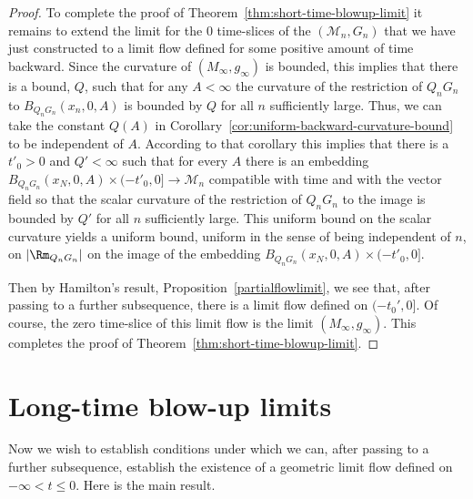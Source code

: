 \begin{proof}
To complete the proof of Theorem~\ref{thm:short-time-blowup-limit} it remains to
extend the limit for the $0$ time-slices of the $({\mathcal
M}_n,G_n)$ that we have just constructed to a limit flow defined for
some positive amount of time backward. Since the curvature of
$(M_\infty,g_\infty)$ is bounded, this implies that there is a
bound, $Q$, such that for any $A<\infty$
 the curvature of the restriction of
$Q_nG_n$ to $B_{Q_nG_n}(x_n,0,A)$ is bounded by $Q$ for all $n$
sufficiently large. Thus, we can take the constant $Q(A)$ in
Corollary~\ref{cor:uniform-backward-curvature-bound} to be independent of $A$. According to that
corollary this implies that there is a $t'_0>0$ and $Q'<\infty$ such
that for every $A$ there is an embedding $B_{Q_nG_n}(x_N,0,A)\times
(-t'_0,0]\to {\mathcal M}_n$ compatible with time and with the
vector field so that the scalar curvature of the restriction of
$Q_nG_n$ to the image is bounded by $Q'$ for all $n$ sufficiently
large. This uniform bound on the scalar curvature yields a uniform
bound, uniform in the sense of being independent of $n$, on $|\Rm_{Q_nG_n}|$ on the image of the embedding
$B_{Q_nG_n}(x_N,0,A)\times (-t'_0,0]$.



 Then by Hamilton's result,
Proposition~\ref{partialflowlimit}, we see that, after passing to a
further subsequence, there is a limit flow defined on $(-t_0',0]$.
Of course, the zero time-slice of this limit flow is the limit
$(M_\infty,g_\infty)$. This completes the proof of
Theorem~\ref{thm:short-time-blowup-limit}.
\end{proof}


\section{Long-time blow-up limits}


Now we wish to establish conditions under which we can, after
passing to a further subsequence, establish the existence of a
geometric limit flow defined on $-\infty<t\le 0$. Here is the main
result.


